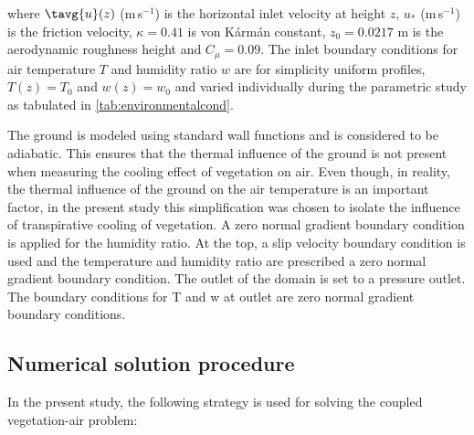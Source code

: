 where $\tavg{u}(z)$ (m\,s$^{-1}$) is the horizontal inlet velocity at height $z$, $u_*$ (m\,s$^{-1}$) is the friction velocity, $\kappa=0.41$ is von K\'arm\'an constant, $z_0=\num{0.0217}$ m is the aerodynamic roughness height and $C_{\mu}=0.09$. The inlet boundary conditions for air temperature $T$ and humidity ratio $w$ are for simplicity uniform profiles, $T(z)=T_0$ and $w(z)=w_0$ and varied individually during the parametric study as tabulated in \cref{tab:environmentalcond}.

The ground is modeled using standard wall functions and is considered to be adiabatic. This ensures that the thermal influence of the ground is not present when measuring the cooling effect of vegetation on air. Even though, in reality, the thermal influence of the ground on the air temperature is an important factor, in the present study this simplification was chosen to isolate the influence of transpirative cooling of vegetation. A zero normal gradient boundary condition is applied for the humidity ratio. At the top, a slip velocity boundary condition is used and the temperature and humidity ratio are prescribed a zero normal gradient boundary condition. The outlet of the domain is set to a pressure outlet. The boundary conditions for T and w at outlet are zero normal gradient boundary conditions. 

\subsection{Numerical solution procedure}

In the present study, the following strategy is used for solving the coupled vegetation-air problem:

